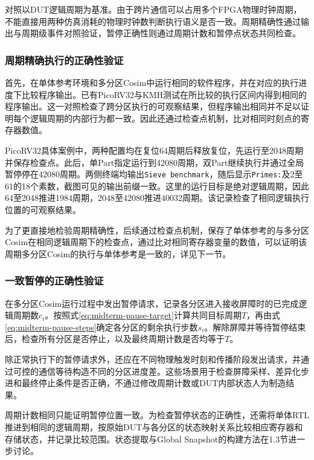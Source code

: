 对照以DUT逻辑周期为基准。由于跨片通信可以占用多个FPGA物理时钟周期，不能直接用两种仿真消耗的物理时钟数判断执行语义是否一致。周期精确性通过输出与周期级事件对照验证，暂停正确性则通过周期计数和暂停点状态共同检查。


\subsubsection{周期精确执行的正确性验证}

首先，在单体参考环境和多分区Cosim中运行相同的软件程序，并在对应的执行进度下比较程序输出。已有PicoRV32与KMH测试在所比较的执行区间内得到相同的程序输出。这一对照检查了跨分区执行的可观察结果，但程序输出相同并不足以证明每个逻辑周期的内部行为都一致。因此还通过检查点机制，比对相同时刻点的寄存器数值。

PicoRV32具体案例中，两种配置均在复位64周期后释放复位，先运行至2048周期并保存检查点。此后，单Part指定运行到42080周期，双Part继续执行并通过全局暂停停在42080周期。两侧终端均输出\texttt{Sieve benchmark}，随后显示\texttt{Primes:}及2至61的18个素数，截图可见的输出前缀一致。这里的运行目标是绝对逻辑周期，因此64至2048推进1984周期，2048至42080推进40032周期。该记录检查了相同逻辑执行位置的可观察结果。

为了更直接地检验周期精确性，后续通过检查点机制，保存了单体参考的与多分区Cosim在相同逻辑周期下的检查点，通过比对相同寄存器变量的数值，可以证明该周期多分区Cosim的执行与单体参考是一致的，详见下一节。


\subsubsection{一致暂停的正确性验证}

在多分区Cosim运行过程中发出暂停请求，记录各分区进入接收屏障时的已完成逻辑周期数$c_i$。按照式\eqref{eq:midterm-pause-target}计算共同目标周期$T$，再由式\eqref{eq:midterm-pause-steps}确定各分区的剩余执行步数$s_i$。解除屏障并等待暂停结束后，检查所有分区是否停止，以及最终周期计数是否均等于$T$。

除正常执行下的暂停请求外，还应在不同物理触发时刻和传播阶段发出请求，并通过可控的通信等待构造不同的分区进度差。这些场景用于检查屏障采样、差异化步进和最终停止条件是否正确，不通过修改周期计数或DUT内部状态人为制造结果。

周期计数相同只能证明暂停位置一致。为检查暂停状态的正确性，还需将单体RTL推进到相同的逻辑周期，按原始DUT与各分区的状态映射关系比较相应寄存器和存储状态，并记录比较范围。状态提取与Global Snapshot的构建方法在1.3节进一步讨论。

